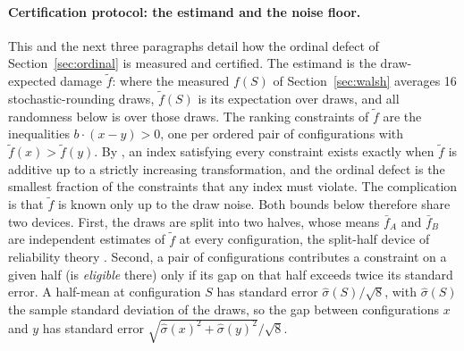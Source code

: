 \paragraph{Certification protocol: the estimand and the noise floor.} This and the next three
paragraphs detail
how the ordinal defect of Section~\ref{sec:ordinal} is measured and certified. The estimand is the
draw-expected damage $\tilde f$: where the measured $f(S)$ of Section~\ref{sec:walsh} averages 16
stochastic-rounding draws, $\tilde f(S)$ is its expectation over draws, and all randomness below is over
those draws. The ranking constraints
of $\tilde f$ are the inequalities $b\cdot(x-y)>0$, one per ordered pair of configurations with
$\tilde f(x)>\tilde f(y)$. By
\thmtwo{}, an index satisfying every constraint exists exactly when $\tilde f$ is additive up to a strictly
increasing transformation, and the ordinal defect is
the smallest fraction of the constraints that any index must violate. The complication is that $\tilde f$
is known only up to the draw noise. Both
bounds below therefore share two devices. First, the draws are split into two halves, whose means
$\bar f_A$ and $\bar f_B$ are independent estimates of $\tilde f$ at every configuration, the split-half device
of reliability theory \citep{spearman1910correlation,brown1910some}. Second, a pair of
configurations contributes a constraint on a given half (is \emph{eligible} there) only if its gap on
that half exceeds twice its standard error. A half-mean at configuration $S$ has standard error
$\hat\sigma(S)/\sqrt{8}$, with $\hat\sigma(S)$ the sample standard deviation of the draws, so the gap
between configurations $x$ and $y$ has standard error
$\sqrt{\hat\sigma(x)^2 + \hat\sigma(y)^2}/\sqrt{8}$.

